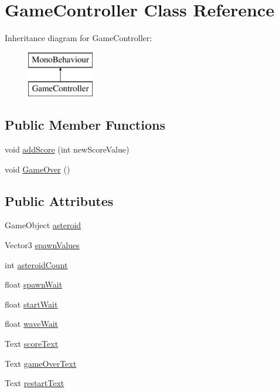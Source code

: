 \hypertarget{class_game_controller}{}\section{Game\+Controller Class Reference}
\label{class_game_controller}
Inheritance diagram for Game\+Controller\+:\begin{figure}[H]
\begin{center}
\leavevmode
\includegraphics[height=2.000000cm]{class_game_controller}
\end{center}
\end{figure}
\subsection*{Public Member Functions}
\begin{DoxyCompactItemize}
\item 
void \mbox{\hyperlink{class_game_controller_a9cd49518487a342b5f635537d10b3589}{add\+Score}} (int new\+Score\+Value)
\item 
void \mbox{\hyperlink{class_game_controller_a867b359e465ba013eec7f1ee03b75118}{Game\+Over}} ()
\end{DoxyCompactItemize}
\subsection*{Public Attributes}
\begin{DoxyCompactItemize}
\item 
Game\+Object \mbox{\hyperlink{class_game_controller_ab280da3f329b7e2532dda6062a58f4fb}{asteroid}}
\item 
Vector3 \mbox{\hyperlink{class_game_controller_a5e4f56c23896d4b528da579f93335896}{spawn\+Values}}
\item 
int \mbox{\hyperlink{class_game_controller_aca9ea9aa49e5af784896d6b895f6be90}{asteroid\+Count}}
\item 
float \mbox{\hyperlink{class_game_controller_a27c91a14de3982813ad3d8245d0134d7}{spawn\+Wait}}
\item 
float \mbox{\hyperlink{class_game_controller_a9b6f96c29d3ee0f2c692c30ed2b12835}{start\+Wait}}
\item 
float \mbox{\hyperlink{class_game_controller_ad210270b367c1c439d35e8177d989019}{wave\+Wait}}
\item 
Text \mbox{\hyperlink{class_game_controller_ad59d43bc8b212847eaae1e877d8c1a31}{score\+Text}}
\item 
Text \mbox{\hyperlink{class_game_controller_aba4351ee1c41d1af6c44c2cb106a4b67}{game\+Over\+Text}}
\item 
Text \mbox{\hyperlink{class_game_controller_a68dea27fd0de9061889d2664697af64f}{restart\+Text}}
\end{DoxyCompactItemize}
